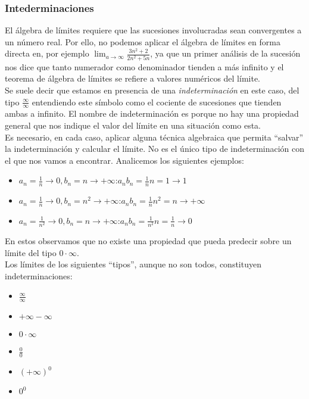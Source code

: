 \documentclass[../Teoría.root.tex]{subfiles}
\begin{document}
    \subsubsection{Intederminaciones}
    El álgebra de límites requiere que las sucesiones involucradas sean convergentes a un número real. Por ello, no podemos aplicar el álgebra de límites en forma directa en, por ejemplo \(\lim_{a\to\infty}\frac{3n^2+2}{2n^2+5n}\), ya que un primer análisis de la sucesión nos dice que tanto numerador como denominador tienden a más infinito y el teorema de álgebra de límites se refiere a valores numéricos del límite.\\
    Se suele decir que estamos en presencia de una \textit{indeterminación} en este caso, del tipo \(\frac{\infty}{\infty}\) entendiendo este símbolo como el cociente de sucesiones que tienden ambas a infinito. El nombre de indeterminación es porque no hay una propiedad general que nos indique el valor del límite en una situación como esta.\\
    Es necesario, en cada caso, aplicar alguna técnica algebraica que permita “salvar” la indeterminación y calcular el límite. No es el único tipo de indeterminación con el que nos vamos a encontrar. Analicemos los siguientes ejemplos:
    \begin{itemize}
        \item \(a_n=\frac{1}{n}\rightarrow0,b_n=n\rightarrow+\infty\):\tab\(a_nb_n=\frac{1}{n}n=1\rightarrow1\)
        \item \(a_n=\frac{1}{n}\rightarrow0,b_n=n^2\rightarrow+\infty\):\tab\(a_nb_n=\frac{1}{n}n^2=n\rightarrow+\infty\)
        \item \(a_n=\frac{1}{n^2}\rightarrow0,b_n=n\rightarrow+\infty\):\tab\(a_nb_n=\frac{1}{n^2}n=\frac{1}{n}\rightarrow0\)
    \end{itemize}
    En estos observamos que no existe una propiedad que pueda predecir sobre un límite del tipo \(0\cdot\infty\).\\
    Los límites de los siguientes “tipos”, aunque no son todos, constituyen indeterminaciones:
    \begin{itemize}
        \item \(\frac{\infty}{\infty}\)
        \item \(+\infty-\infty\)
        \item \(0\cdot\infty\)
        \item \(\frac{0}{0}\)
        \item \((+\infty)^0\)
        \item \(0^0\)
    \end{itemize}
\end{document}
